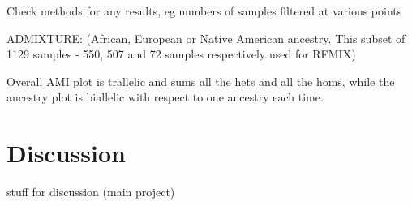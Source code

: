 \documentclass[11pt]{article}
\begin{document}
Check methods for any results, eg numbers of samples filtered at various points 

ADMIXTURE: (African, European or Native American ancestry. This subset of  1129 samples - 550, 507 and 72 samples respectively used for RFMIX)



Overall AMI plot is trallelic and sums all the hets and all the homs, while the ancestry plot is biallelic with respect to one ancestry each time.


















\section{Discussion}












stuff for discussion (main project)
\end{document}
